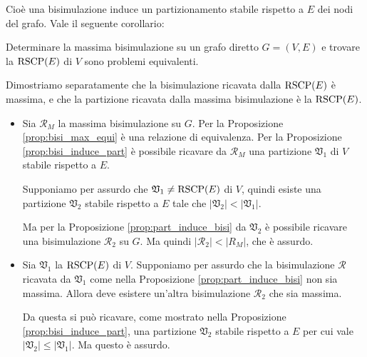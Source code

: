 Cioè una bisimulazione induce un partizionamento stabile rispetto a $E$ dei nodi del grafo. Vale il seguente corollario:
\begin{corollary}
    Determinare la massima bisimulazione su un grafo diretto $G = (V,E)$ e trovare la $\textup{RSCP}(E)$ di $V$ sono problemi equivalenti.
\end{corollary}
\begin{proof2}
    Dimostriamo separatamente che la bisimulazione ricavata dalla $\textup{RSCP}(E)$ è massima, e che la partizione ricavata dalla massima bisimulazione è la $\textup{RSCP}(E)$.
    \begin{itemize}
        \item Sia $\mathcal{R}_M$ la massima bisimulazione su $G$. Per la Proposizione \ref{prop:bisi_max_equi} è una relazione di equivalenza. Per la Proposizione \ref{prop:bisi_induce_part} è possibile ricavare da $\mathcal{R}_M$ una partizione $\mathfrak{V}_1$ di $V$ stabile rispetto a $E$.

        Supponiamo per assurdo che $\mathfrak{V}_1 \neq \textup{RSCP}(E)$ di $V$, quindi esiste una partizione $\mathfrak{V}_2$ stabile rispetto a $E$ tale che $|\mathfrak{V}_2| < |\mathfrak{V}_1|$.

        Ma per la Proposizione \ref{prop:part_induce_bisi} da
        $\mathfrak{V}_2$ è possibile ricavare una bisimulazione $\mathcal{R}_2$ su $G$. Ma quindi $|\mathcal{R}_2| < |R_M|$, che è assurdo.
        \item Sia $\mathfrak{V}_1$ la $\textup{RSCP}(E)$ di $V$. Supponiamo per assurdo che la bisimulazione $\mathcal{R}$ ricavata da $\mathfrak{V}_1$ come nella Proposizione \ref{prop:part_induce_bisi} non sia massima. Allora deve esistere un'altra bisimulazione $\mathcal{R}_2$ che
        sia massima.

        Da questa si può ricavare, come mostrato nella Proposizione \ref{prop:bisi_induce_part}, una partizione $\mathfrak{V}_2$ stabile rispetto a $E$ per cui vale $|\mathfrak{V}_2| \leq |\mathfrak{V}_1|$. Ma questo è assurdo.
    \end{itemize}
    \vspace*{-0.75cm}
\end{proof2}
